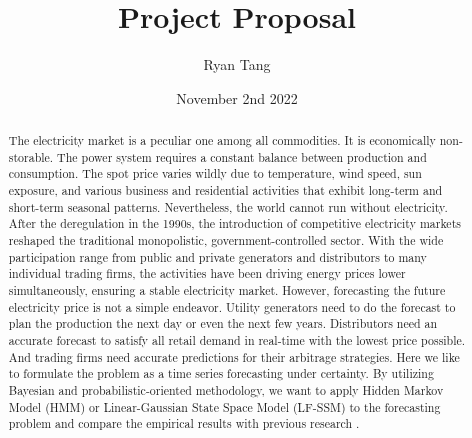 \documentclass[11pt, letterpaper, journal]{IEEEtran}
\title{Project Proposal}
\author{Ryan Tang}
\date{November 2nd 2022}
\begin{document}
\maketitle

\begin{abstract}
    The electricity market is a peculiar one among all commodities. It is economically non-storable. The power system requires a constant balance between production and consumption. The spot price varies wildly due to temperature, wind speed, sun exposure, and various business and residential activities that exhibit long-term and short-term seasonal patterns. Nevertheless, the world cannot run without electricity. After the deregulation in the 1990s, the introduction of competitive electricity markets reshaped the traditional monopolistic, government-controlled sector. With the wide participation range from public and private generators and distributors to many individual trading firms, the activities have been driving energy prices lower simultaneously, ensuring a stable electricity market. However, forecasting the future electricity price is not a simple endeavor. Utility generators need to do the forecast to plan the production the next day or even the next few years. Distributors need an accurate forecast to satisfy all retail demand in real-time with the lowest price possible. And trading firms need accurate predictions for their arbitrage strategies. Here we like to formulate the problem as a time series forecasting under certainty. By utilizing Bayesian and probabilistic-oriented methodology, we want to apply Hidden Markov Model (HMM) or Linear-Gaussian State Space Model (LF-SSM) to the forecasting problem and compare the empirical results with previous research \cite{Nowotarski}.

\end{abstract}

\printbibliography[heading=bibintoc, title={References}]
\end{document}
